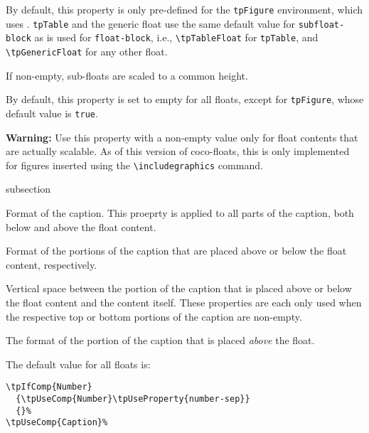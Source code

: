 By default, this property is only pre-defined for the \lstinline{tpFigure}
environment, which uses
\texttt{\string\tpFigureSubFloat}. \lstinline{tpTable} and the generic
float use the same default value for \lstinline{subfloat-block} as is
used for \lstinline{float-block}, i.e., \lstinline{\tpTableFloat} for
\lstinline{tpTable}, and \lstinline{\tpGenericFloat} for any other
float.


If non-empty, sub-floats are scaled to a common height. 

By default, this property is set to empty for all floats, except for
\lstinline{tpFigure}, whose default value is \lstinline{true}. 

\textbf{Warning:} Use this property with a non-empty value only for
float contents that are actually scalable. As of this version of
coco-floats, this is only implemented for figures inserted using
the \lstinline{\includegraphics} command.

\begin{heading}[label=sec:flt:capt]{subsection}
\end{heading}


Format of the caption. This proeprty is applied to all parts of the
caption, both below and above the float content.


Format of the portions of the caption that are placed above or below
the float content, respectively.


Vertical space between the portion of the caption that is placed above
or below the float content and the content itself. These properties
are each only used when the respective top or bottom portions of the
caption are non-empty.



The format of the portion of the caption that is placed \textit{above}
the float.

The default value for all floats is:
\begin{lstlisting}[style=tex]
\tpIfComp{Number}
  {\tpUseComp{Number}\tpUseProperty{number-sep}}
  {}%
\tpUseComp{Caption}%
\end{lstlisting}


